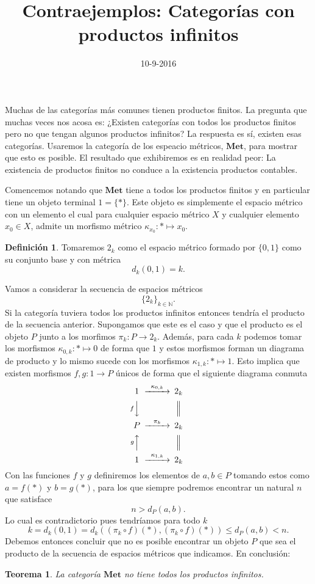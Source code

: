 \documentclass[letter,10pt,notitlepage]{amsart}
\title{Contraejemplos: Categorías con productos infinitos}
\date{10-9-2016}
\newtheorem{theorem}{Teorema}
\theoremstyle{definition}
\newtheorem*{definition}{Definición}
\theoremstyle{remark}
\begin{document}
\maketitle

Muchas de las categorías más comunes tienen productos finitos. La
pregunta que muchas veces nos acosa es: ¿Existen categorías con todos
los productos finitos pero no que tengan algunos productos infinitos?
La respuesta es sí, existen esas categorías. Usaremos la categoría de
los espeacio métricos, \( \mathbf{Met}\), para mostrar que esto es
posible. El resultado que exhibiremos es en realidad peor: La
existencia de productos finitos no conduce a la existencia productos
contables.

Comencemos notando que \(\mathbf{Met}\) tiene a todos los productos
finitos y en particular tiene un objeto terminal \(1=\{\ast\}\). Este
objeto es simplemente el espacio métrico con un elemento el cual para
cualquier espacio métrico \(X\) y cualquier elemento \(x_0 \in X\),
admite un morfismo métrico \( \kappa_{x_0} \colon \ast \mapsto x_0 \).

\begin{definition}
  Tomaremos \(2_{k}\) como el espacio métrico formado por \( \{0,1\}\)
  como su conjunto base y con métrica
  \[d_k(0,1) = k.\]
\end{definition}

Vamos a considerar la secuencia de espacios métricos
\[ \{2_k\}_{k \in \mathbb{N}}.\] Si la categoría tuviera todos los
productos infinitos entonces tendría el producto de la secuencia
anterior. Supongamos que este es el caso y que el producto es el
objeto \(P\) junto a los morfimos \(\pi_k \colon P \to 2_k\). Además,
para cada \(k\) podemos tomar los morfismos
\(\kappa_{0,k} \colon \ast \mapsto 0\) de forma que \(1\) y estos morfismos
forman un diagrama de producto y lo mismo sucede con los morfismos
\(\kappa_{1,k} \colon \ast \mapsto 1\). Esto implica que existen
morfismos \(f,g \colon 1 \to P\) únicos de forma que el siguiente
diagrama conmuta
\begin{equation*}
  \begin{CD}
    1 @>\kappa_{0,k}>>    2_k \\
    @VfVV     @| \\
    P @> \pi_k >>    2_k \\
    @AgAA    @| \\
    1 @>\kappa_{1,k}>>    2_k
  \end{CD}
\end{equation*}
Con las funciones \(f\) y \(g\) definiremos los elementos de \(a,b \in
P\) tomando estos como \(a = f(\ast)\) y \(b = g(\ast)\), para los que
siempre podremos encontrar un natural \(n\) que satisface
\[ n > d_P(a,b).\]
Lo cual es contradictorio pues tendríamos para todo \(k\)
\[
  k = d_k(0,1)
  =  d_k((\pi_k \circ f)(\ast), (\pi_k \circ f)(\ast))
  \leq d_P(a,b) < n.
\]
Debemos entonces concluir que no es posible encontrar un objeto \(P\)
que sea el producto de la secuencia de espacios métricos que
indicamos. En conclusión:

\begin{theorem}
  La categoría \( \mathbf{Met}\) no tiene todos los productos
  infinitos.
\end{theorem}
\end{document}

